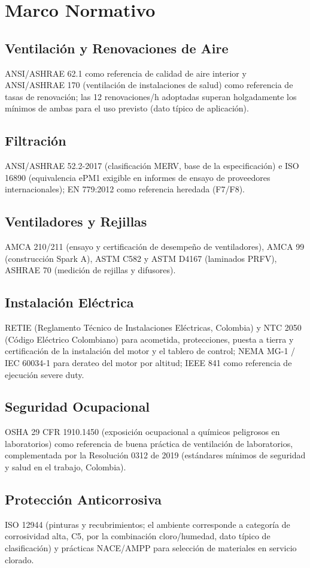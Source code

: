 \section{Marco Normativo}

\subsection{Ventilación y Renovaciones de Aire}

ANSI/ASHRAE 62.1 como referencia de calidad de aire interior y ANSI/ASHRAE 170 (ventilación de instalaciones de salud) como referencia de tasas de renovación; las 12 renovaciones/h adoptadas superan holgadamente los mínimos de ambas para el uso previsto (dato típico de aplicación).

\subsection{Filtración}

ANSI/ASHRAE 52.2-2017 (clasificación MERV, base de la especificación) e ISO 16890 (equivalencia ePM1 exigible en informes de ensayo de proveedores internacionales); EN 779:2012 como referencia heredada (F7/F8).

\subsection{Ventiladores y Rejillas}

AMCA 210/211 (ensayo y certificación de desempeño de ventiladores), AMCA 99 (construcción Spark A), ASTM C582 y ASTM D4167 (laminados PRFV), ASHRAE 70 (medición de rejillas y difusores).

\subsection{Instalación Eléctrica}

RETIE (Reglamento Técnico de Instalaciones Eléctricas, Colombia) y NTC 2050 (Código Eléctrico Colombiano) para acometida, protecciones, puesta a tierra y certificación de la instalación del motor y el tablero de control; NEMA MG-1 / IEC 60034-1 para derateo del motor por altitud; IEEE 841 como referencia de ejecución severe duty.

\subsection{Seguridad Ocupacional}

OSHA 29 CFR 1910.1450 (exposición ocupacional a químicos peligrosos en laboratorios) como referencia de buena práctica de ventilación de laboratorios, complementada por la Resolución 0312 de 2019 (estándares mínimos de seguridad y salud en el trabajo, Colombia).

\subsection{Protección Anticorrosiva}

ISO 12944 (pinturas y recubrimientos; el ambiente corresponde a categoría de corrosividad alta, C5, por la combinación cloro/humedad, dato típico de clasificación) y prácticas NACE/AMPP para selección de materiales en servicio clorado.
